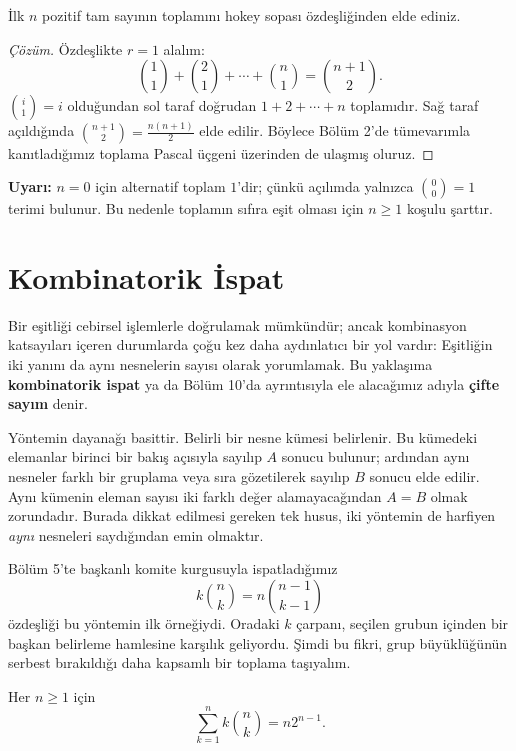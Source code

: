 \begin{example}
İlk $n$ pozitif tam sayının toplamını hokey sopası özdeşliğinden elde ediniz.
\end{example}
\begin{proof}[Çözüm]
Özdeşlikte $r=1$ alalım:
\[
\binom11+\binom21+\cdots+\binom n1=\binom{n+1}{2}.
\]
$\binom{i}{1}=i$ olduğundan sol taraf doğrudan $1+2+\cdots+n$ toplamıdır. Sağ taraf açıldığında $\binom{n+1}{2}=\frac{n(n+1)}{2}$ elde edilir. Böylece Bölüm 2'de tümevarımla kanıtladığımız toplama Pascal üçgeni üzerinden de ulaşmış oluruz.
\end{proof}

\textbf{Uyarı:} $n=0$ için alternatif toplam $1$'dir; çünkü açılımda yalnızca $\binom00=1$ terimi bulunur. Bu nedenle toplamın sıfıra eşit olması için $n\ge1$ koşulu şarttır.

\section{Kombinatorik İspat}

Bir eşitliği cebirsel işlemlerle doğrulamak mümkündür; ancak kombinasyon katsayıları içeren durumlarda çoğu kez daha aydınlatıcı bir yol vardır: Eşitliğin iki yanını da aynı nesnelerin sayısı olarak yorumlamak. Bu yaklaşıma \textbf{kombinatorik ispat} ya da Bölüm 10'da ayrıntısıyla ele alacağımız adıyla \textbf{çifte sayım} denir.

Yöntemin dayanağı basittir. Belirli bir nesne kümesi belirlenir. Bu kümedeki elemanlar birinci bir bakış açısıyla sayılıp $A$ sonucu bulunur; ardından aynı nesneler farklı bir gruplama veya sıra gözetilerek sayılıp $B$ sonucu elde edilir. Aynı kümenin eleman sayısı iki farklı değer alamayacağından $A=B$ olmak zorundadır. Burada dikkat edilmesi gereken tek husus, iki yöntemin de harfiyen \emph{aynı} nesneleri saydığından emin olmaktır.

Bölüm 5'te başkanlı komite kurgusuyla ispatladığımız
\[
k\binom{n}{k}=n\binom{n-1}{k-1}
\]
özdeşliği bu yöntemin ilk örneğiydi. Oradaki $k$ çarpanı, seçilen grubun içinden bir başkan belirleme hamlesine karşılık geliyordu. Şimdi bu fikri, grup büyüklüğünün serbest bırakıldığı daha kapsamlı bir toplama taşıyalım.

\begin{theorem}
Her $n\ge1$ için
\[
\sum_{k=1}^{n}k\binom{n}{k}=n2^{n-1}.
\]
\end{theorem}

